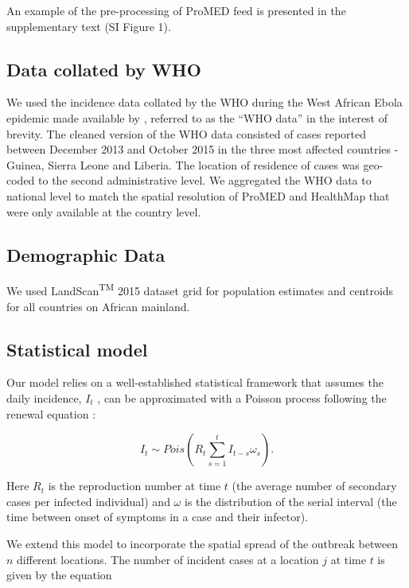 \documentclass[9pt,twocolumn,twoside,lineno]{pnas-new}
\begin{document}
{An example of the pre-processing of ProMED feed is presented in the
supplementary text (SI Figure 1).

\subsection*{Data collated by WHO}\label{data-collated-by-who}

We used the incidence data collated by the WHO during the West African
Ebola epidemic made available by \cite{garske20160308}, referred to as
the ``WHO data'' in the interest of brevity. The cleaned version of the
WHO data consisted of cases reported between December 2013 and October
2015 in the three most affected countries - Guinea, Sierra Leone and
Liberia. The location of residence of cases was geo-coded to the second
administrative level. We aggregated the WHO data to national level to
match the spatial resolution of ProMED and HealthMap that were only
available at the country level.

\subsection*{Demographic Data}\label{demographic-data}

We used LandScan\textsuperscript{TM} 2015 dataset grid \cite{landscan}
for population estimates and centroids for all countries on African
mainland.

\subsection{Statistical model}\label{statistical-model}

Our model relies on a well-established statistical framework that
assumes the daily incidence, \(I_t\) , can be approximated with a
Poisson process following the renewal equation
\cite{fraser2007estimating}:

\begin{equation*}
  I_{t} \sim 
  Pois
  \left( 
    R_t \sum_{s = 1}^{t}{I_{t - s}\omega_s}
  \right).
\end{equation*}

Here \(R_t\) is the reproduction number at time \(t\) (the average
number of secondary cases per infected individual) and \(\omega\) is the
distribution of the serial interval (the time between onset of symptoms
in a case and their infector).

We extend this model to incorporate the spatial spread of the outbreak
between \(n\) different locations. The number of incident cases at a
location \(j\) at time \(t\) is given by the equation

}
\end{document}
